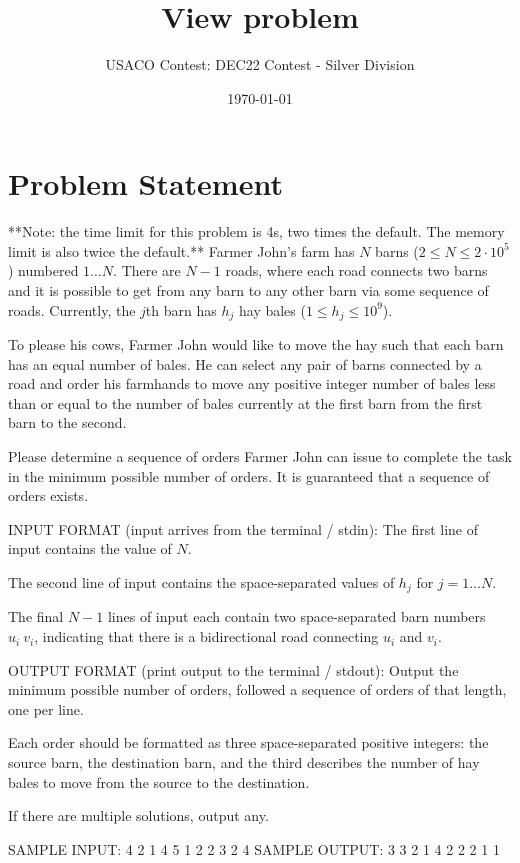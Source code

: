 \documentclass[12pt]{article}
\title{View problem}
\author{USACO Contest: DEC22 Contest - Silver Division}
\date{\today}
\begin{document}
\maketitle

\section*{Problem Statement}

**Note: the time limit for this problem is 4s, two times the default. The memory limit is also twice the default.**
Farmer John's farm has $N$ barns ($2 \leq N \leq 2\cdot 10^5$) numbered
$1 \dots N$. There are $N-1$ roads, where each road connects two barns and it is
possible to get from any barn to any other barn via some sequence of roads.
Currently, the $j$th barn has $h_j$ hay bales ($1\le h_j\le 10^9$).

To please his cows, Farmer John would like to move the hay such that each barn
has an equal number of bales. He can select any pair of barns connected by a
road and order his farmhands to move any positive integer number of bales less
than or equal to the number of bales currently at the first barn from the first
barn to the second.

Please determine a sequence of orders Farmer John can issue to complete the task
in the minimum possible number of orders. It is guaranteed that a sequence of
orders exists.

INPUT FORMAT (input arrives from the terminal / stdin):
The first line of input contains the value of $N.$

The second line of input contains the space-separated values of $h_j$ for
$j = 1 \dots N$.

The final $N-1$ lines of input each contain two space-separated barn numbers
$u_i \ v_i$, indicating that there is a bidirectional road connecting $u_i$ and
$v_i$.

OUTPUT FORMAT (print output to the terminal / stdout):
Output the minimum possible number of orders, followed a sequence of orders of
that length, one per line.

Each order should be formatted as three space-separated positive integers: the
source barn, the destination barn, and the third describes the number of hay
bales to move from the source to the destination. 

If there are multiple solutions, output any.

SAMPLE INPUT:
4
2 1 4 5
1 2
2 3
2 4
SAMPLE OUTPUT: 
3
3 2 1
4 2 2
2 1 1
\end{document}
